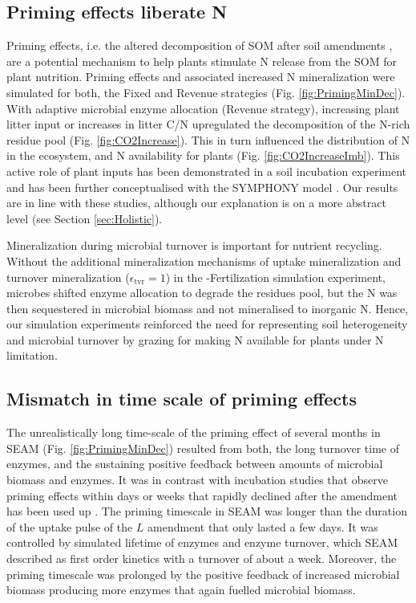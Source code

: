 \subsection{Priming effects liberate N}
Priming effects, i.e. the altered decomposition of SOM after soil amendments
\citep{Kuzyakov00}, are a potential mechanism to help plants stimulate N release
from the SOM for plant nutrition.
Priming effects and associated increased N mineralization were simulated for
both, the Fixed and Revenue strategies (Fig. \ref{fig:PrimingMinDec}). With
adaptive microbial enzyme allocation (Revenue strategy), increasing
plant litter input or increases in litter C/N upregulated
the decomposition of the N-rich residue pool (Fig.
\ref{fig:CO2Increase}).
This in turn influenced the distribution of N in the ecosystem, and N
availability for plants (Fig.
\ref{fig:CO2IncreaseImb}). This active role of plant inputs has been
demonstrated in a soil incubation experiment \citep{Fontaine11} and has been
further conceptualised with the SYMPHONY model \citep{Perveen14}. Our results
are in line with these studies, although our explanation is on a more abstract
level (see Section \ref{sec:Holistic}). 

Mineralization during microbial turnover is important for nutrient recycling.
Without the additional mineralization mechanisms of uptake mineralization
\citep{Manzoni08} and turnover mineralization \citep{Clarholm85, Raynaud06}
($\epsilon_{\operatorname{tvr}}=1$) in the -Fertilization simulation
experiment, microbes shifted enzyme allocation to degrade the residues pool, but
the N was then sequestered in microbial biomass and not mineralised to inorganic
N. Hence, our simulation experiments reinforced the need for representing soil
heterogeneity and microbial turnover by grazing for making N available for
plants under N limitation.

\subsection{Mismatch in time scale of priming effects}
The unrealistically long time-scale of the priming effect of several months in
SEAM (Fig. \ref{fig:PrimingMinDec}) resulted from both, the long turnover time of
enzymes, and the sustaining positive feedback between amounts of microbial
biomass and enzymes. It was in contrast with incubation studies that observe
priming effects within days or weeks that rapidly declined after the amendment
has been used up \citep{Blagodatskaya14}.
The priming timescale in SEAM was longer than the duration of the uptake pulse
of the $L$ amendment that only lasted a few days. It was controlled by simulated
lifetime of enzymes and enzyme turnover, which SEAM described as first order
kinetics with a turnover of about a week. Moreover, the priming timescale was
prolonged by the positive feedback of increased microbial biomass producing more
enzymes that again fuelled microbial biomass. 

